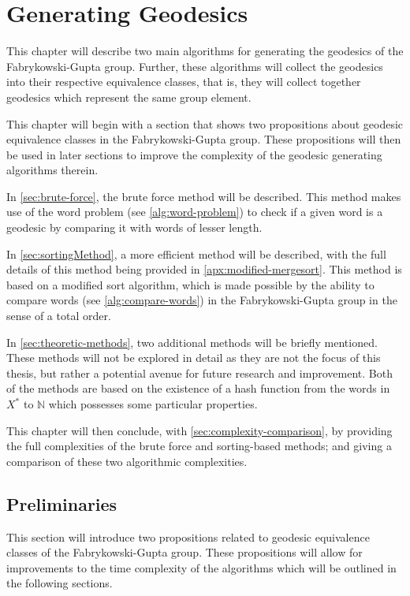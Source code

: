 \chapter{Generating Geodesics}
\label{chp:generating-geodesics}

This chapter will describe two main algorithms for generating the geodesics of the Fabrykowski-Gupta group.
Further, these algorithms will collect the geodesics into their respective equivalence classes, that is, they will collect together geodesics which represent the same group element.

This chapter will begin with a section that shows two propositions about geodesic equivalence classes in the Fabrykowski-Gupta group.
These propositions will then be used in later sections to improve the complexity of the geodesic generating algorithms therein.

In \cref{sec:brute-force}, the brute force method will be described.
This method makes use of the word problem (see \cref{alg:word-problem}) to check if a given word is a geodesic by comparing it with words of lesser length.

In \cref{sec:sortingMethod}, a more efficient method will be described, with the full details of this method being provided in \cref{apx:modified-mergesort}.
This method is based on a modified sort algorithm, which is made possible by the ability to compare words (see \cref{alg:compare-words}) in the Fabrykowski-Gupta group in the sense of a total order.

In \cref{sec:theoretic-methods}, two additional methods will be briefly mentioned.
These methods will not be explored in detail as they are not the focus of this thesis, but rather a potential avenue for future research and improvement.
Both of the methods are based on the existence of a hash function from the words in $X^\ast$ to $\mathbb{N}$ which possesses some particular properties.

This chapter will then conclude, with \cref{sec:complexity-comparison}, by providing the full complexities of the brute force and sorting-based methods; and giving a comparison of these two algorithmic complexities.

\section{Preliminaries}

This section will introduce two propositions related to geodesic equivalence classes of the Fabrykowski-Gupta group.
These propositions will allow for improvements to the time complexity of the algorithms which will be outlined in the following sections.

